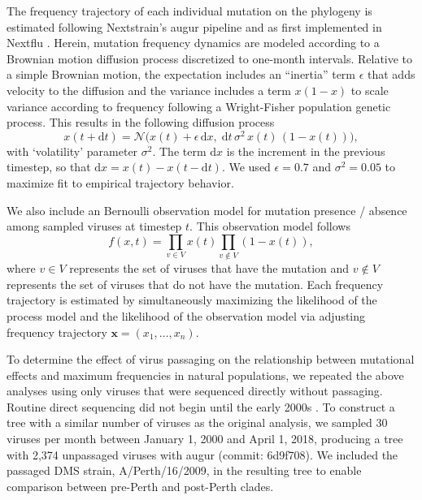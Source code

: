 \documentclass[9pt,twocolumn,twoside]{pnas-new}
\begin{document}
{%
\newcommand{\dx}{\mathrm{d}x}						%
\newcommand{\dy}{\mathrm{d}y}						%
\newcommand{\dt}{\mathrm{d}t}						%
\newcommand{\inertia}{\epsilon}			    %
\newcommand{\normal}{\mathcal{N}}				%

The frequency trajectory of each individual mutation on the phylogeny is estimated following Nextstrain's augur pipeline and as first implemented in Nextflu \cite{neher2015nextflu}.
Herein, mutation frequency dynamics are modeled according to a Brownian motion diffusion process discretized to one-month intervals.
Relative to a simple Brownian motion, the expectation includes an ``inertia'' term $\inertia$ that adds velocity to the diffusion and the variance includes a term $x(1-x)$ to scale variance according to frequency following a Wright-Fisher population genetic process.
This results in the following diffusion process
\begin{equation}
x(t+\dt) = \normal\big( x(t) + \inertia \, \dx , \; \dt \, \sigma^2 \, x(t) \, (1-x(t)) \big),
\end{equation}
with `volatility' parameter $\sigma^2$.
The term $\dx$ is the increment in the previous timestep, so that $\dx = x(t) - x(t-\dt)$.
We used $\inertia = 0.7$ and $\sigma^2 = 0.05$ to maximize fit to empirical trajectory behavior.

We also include an Bernoulli observation model for mutation presence / absence among sampled viruses at timestep $t$.
This observation model follows
\begin{equation}
f(x,t) = \prod_{v\in V} x(t) \prod_{v\notin V} (1-x(t)),
\end{equation}
where $v\in V$ represents the set of viruses that have the mutation and $v\notin V$ represents the set of viruses that do not have the mutation.
Each frequency trajectory is estimated by simultaneously maximizing the likelihood of the process model and the likelihood of the observation model via adjusting frequency trajectory $\mathbf{x}=(x_1, \ldots, x_n)$.

To determine the effect of virus passaging on the relationship between mutational effects and maximum frequencies in natural populations, we repeated the above analyses using only viruses that were sequenced directly without passaging.
Routine direct sequencing did not begin until the early 2000s \cite{mcwhite2016sequence}.
To construct a tree with a similar number of viruses as the original analysis, we sampled 30 viruses per month between January 1, 2000 and April 1, 2018, producing a tree with 2,374 unpassaged viruses with augur (commit: 6d9f708).
We included the passaged DMS strain, A/Perth/16/2009, in the resulting tree to enable comparison between pre-Perth and post-Perth clades.

}
\end{document}
